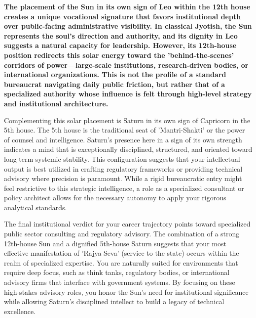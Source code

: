 \label{topic48}

{\fontsize{9.5}{13.8}\selectfont\bfseries\color{DeepSlate} The placement of the Sun in its own sign of Leo within the 12th house creates a unique vocational signature that favors institutional depth over public-facing administrative visibility. In classical Jyotish, the Sun represents the soul's direction and authority, and its dignity in Leo suggests a natural capacity for leadership. However, its 12th-house position redirects this solar energy toward the 'behind-the-scenes' corridors of power---large-scale institutions, research-driven bodies, or international organizations. This is not the profile of a standard bureaucrat navigating daily public friction, but rather that of a specialized authority whose influence is felt through high-level strategy and institutional architecture.}\par\vspace{2mm}

{\fontsize{9}{13}\selectfont Complementing this solar placement is Saturn in its own sign of Capricorn in the 5th house. The 5th house is the traditional seat of 'Mantri-Shakti' or the power of counsel and intelligence. Saturn's presence here in a sign of its own strength indicates a mind that is exceptionally disciplined, structured, and oriented toward long-term systemic stability. This configuration suggests that your intellectual output is best utilized in crafting regulatory frameworks or providing technical advisory where precision is paramount. While a rigid bureaucratic entry might feel restrictive to this strategic intelligence, a role as a specialized consultant or policy architect allows for the necessary autonomy to apply your rigorous analytical standards.}\par\vspace{1.8mm}

{\fontsize{9}{13}\selectfont The final institutional verdict for your career trajectory points toward specialized public sector consulting and regulatory advisory. The combination of a strong 12th-house Sun and a dignified 5th-house Saturn suggests that your most effective manifestation of 'Rajya Seva' (service to the state) occurs within the realm of specialized expertise. You are naturally suited for environments that require deep focus, such as think tanks, regulatory bodies, or international advisory firms that interface with government systems. By focusing on these high-stakes advisory roles, you honor the Sun's need for institutional significance while allowing Saturn's disciplined intellect to build a legacy of technical excellence.}\par\vspace{1.8mm}

